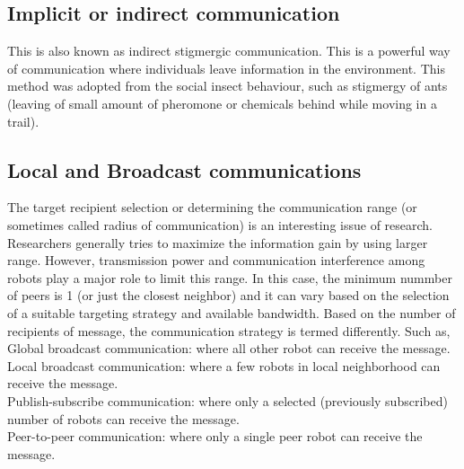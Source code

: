 \subsection*{Implicit or indirect communication} 
This is also known as indirect stigmergic communication. This is a powerful way of communication where individuals leave information in the environment. This method was adopted from the social insect behaviour, such as stigmergy of ants (leaving of small amount of pheromone or chemicals behind while moving in a trail). 

\subsection*{Local and Broadcast communications}
The target recipient selection or determining the communication range (or sometimes called radius of communication) is an interesting issue of research. Researchers generally tries to maximize the information gain by using larger range. However, transmission power and communication interference among robots play a major role to limit this range. In this case, the minimum nummber of peers is 1 (or just the closest neighbor) and it can vary based on the selection of a suitable targeting strategy and available bandwidth. Based on the number of recipients of message, the communication strategy is termed differently. Such as,\\
Global broadcast communication: where all other robot can receive the message.\\
Local broadcast communication: where a few robots in local neighborhood can receive the message.\\
Publish-subscribe communication: where only a selected (previously subscribed) number of robots can receive the message.\\
Peer-to-peer communication: where only a single peer robot can receive the message.\\

